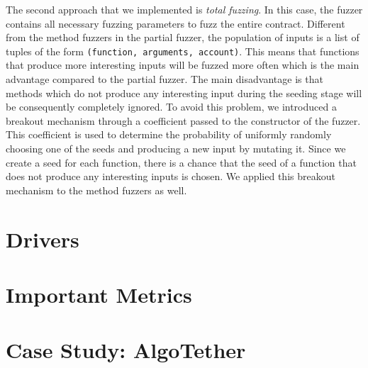The second approach that we implemented is \textit{total fuzzing}.
In this case, the fuzzer contains all necessary fuzzing parameters to fuzz the entire contract.
Different from the method fuzzers in the partial fuzzer, the population of inputs is a list of tuples of the form \texttt{(function, arguments, account)}.
This means that functions that produce more interesting inputs will be fuzzed more often which is the main advantage compared to the partial fuzzer.
The main disadvantage is that methods which do not produce any interesting input during the seeding stage will be consequently completely ignored.
To avoid this problem, we introduced a breakout mechanism through a coefficient passed to the constructor of the fuzzer.
This coefficient is used to determine the probability of uniformly randomly choosing one of the seeds and producing a new input by mutating it.
Since we create a seed for each function, there is a chance that the seed of a function that does not produce any interesting inputs is chosen.
We applied this breakout mechanism to the method fuzzers as well.



\section{Drivers}\label{section:drivers}

\section{Important Metrics}

\section{Case Study: AlgoTether}
